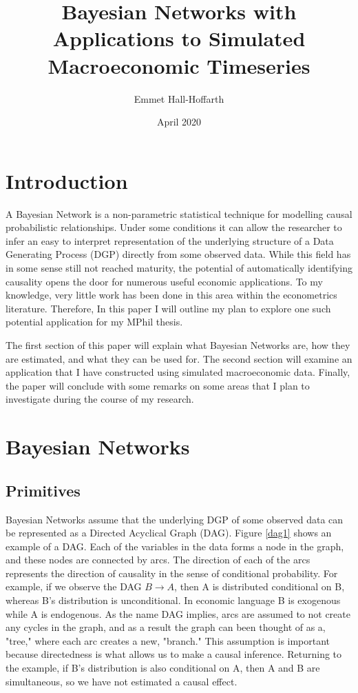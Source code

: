\documentclass{article}
\title{Bayesian Networks with Applications to Simulated Macroeconomic Timeseries}
\author{Emmet Hall-Hoffarth}
\date{April 2020}
\begin{document}
\maketitle

\section{Introduction}
A Bayesian Network \cite{pearl2011bayesian} \cite{pearl2009causality} is a non-parametric statistical technique for modelling causal probabilistic relationships. Under some conditions it can allow the researcher to infer an easy to interpret representation of the underlying structure of a Data Generating Process (DGP) directly from some observed data. While this field has in some sense still not reached maturity, the potential of automatically identifying causality opens the door for numerous useful economic applications. To my knowledge, very little work has been done in this area within the econometrics literature. Therefore, In this paper I will outline my plan to explore one such potential application for my MPhil thesis.

The first section of this paper will explain what Bayesian Networks are, how they are estimated, and what they can be used for. The second section will examine an application that I have constructed using simulated macroeconomic data. Finally, the paper will conclude with some remarks on some areas that I plan to investigate during the course of my research. 

\section{Bayesian Networks}

\subsection{Primitives} \label{prim}

Bayesian Networks assume that the underlying DGP of some observed data can be represented as a Directed Acyclical Graph (DAG). Figure \ref{dag1} shows an example of a DAG. Each of the variables in the data forms a node in the graph, and these nodes are connected by arcs. The direction of each of the arcs represents the direction of causality in the sense of conditional probability. For example, if we observe the DAG $B \rightarrow A$, then A is distributed conditional on B, whereas B's distribution is unconditional. In economic language B is exogenous while A is endogenous. As the name DAG implies, arcs are assumed to not create any cycles in the graph, and as a result the graph can been thought of as a, "tree," where each arc creates a new, "branch." This assumption is important because directedness is what allows us to make a causal inference. Returning to the example, if B's distribution is also conditional on A, then A and B are simultaneous, so we have not estimated a causal effect.
\end{document}
